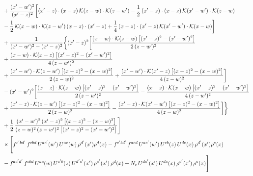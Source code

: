 \documentclass[9pt]{article}
\numberwithin{equation}{section}
\begin{document}
\begin{align}
&+\frac{(x^{\prime}-w^{\prime})^{2}}{(x^{\prime}-z)^{2}}\bigg[(x^{\prime}-z)\cdot(x-z)\,\mathcal{K}(z-w)\cdot\mathcal{K}(z-w^{\prime})-\frac{1}{2}\,(x^{\prime}-z)\cdot(x-z)\,\mathcal{K}(x^{\prime}-w^{\prime})\cdot\mathcal{K}(z-w)\notag \\ & -\frac{1}{2}\,\mathcal{K}(x-w)\cdot\mathcal{K}(z-w^{\prime})\,(x-z)\cdot(x^{\prime}-z)+\frac{1}{4}\,(x-z)\cdot(x^{\prime}-z)\,\mathcal{K}(x^{\prime}-w^{\prime})\cdot\mathcal{K}(x-w)\bigg]\notag\\
&+\frac{1}{(x^{\prime}-w^{\prime})^{2}-(x^{\prime}-z)^{2}}\bigg\{(x^{\prime}-z)^{2}\bigg[\frac{(x-w)\cdot\mathcal{K}(z-w)\,\big[(x^{\prime}-z)^{2}-(x^{\prime}-w^{\prime})^{2}\big]}{2\,(z-w^{\prime})^{2}}\notag\\ &+\frac{(x-w)\cdot\mathcal{K}(x-z)\,\big[(x^{\prime}-z)^{2}-(x^{\prime}-w^{\prime})^{2}\big]}{4\,(z-w^{\prime})^{2}}\notag \\ & +\frac{(x^{\prime}-w^{\prime})\cdot\mathcal{K}(z-w^{\prime})\,\big[(x-z)^{2}-(x-w)^{2}\big]}{2\,(z-w)^{2}}+\frac{(x^{\prime}-w^{\prime})\cdot\mathcal{K}(x^{\prime}-z)\,\big[(x-z)^{2}-(x-w)^{2}\big]}{4\,(z-w)^{2}}\bigg]\notag\\
&-(x^{\prime}-w^{\prime})^{2}\bigg[\frac{(x-z)\cdot\mathcal{K}(z-w)\,\big[(x^{\prime}-z)^{2}-(x^{\prime}-w^{\prime})^{2}\big]}{2\,(z-w^{\prime})^{2}}-\frac{(x-z)\cdot\mathcal{K}(x-w)\,\big[(x^{\prime}-z)^{2}-(x^{\prime}-w^{\prime})^{2}\big]}{4\,(z-w^{\prime})^{2}}\notag \\ & +\frac{(x^{\prime}-z)\cdot\mathcal{K}(z-w^{\prime})\,\big[(x-z)^{2}-(x-w)^{2}\big]}{2\,(z-w)^{2}}-\frac{(x^{\prime}-z)\cdot\mathcal{K}(x^{\prime}-w^{\prime})\,\big[(x-z)^{2}-(x-w)^{2}\big]}{4\,(z-w)^{2}}\bigg]\bigg\}\notag\\
&+\frac{1}{2}\,\frac{(x^{\prime}-w^{\prime})^{2}\,(x^{\prime}-z)^{2}\,\big[(x-z)^{2}-(x-w)^{2}\big]}{(z-w)^{2}\,(z-w^{\prime})^{2}\,\big[(x^{\prime}-z)^{2}-(x^{\prime}-w^{\prime})^{2}\big]}\Bigg]\notag\\
&\times\Bigg[f^{c^{\prime}bd^{\prime}}\,f^{cbd}\, U^{ac^{\prime}}(w^{\prime})\,U^{ac}(w)\,\rho^{d^{\prime}}(x^{\prime})\rho^{d}(x)- f^{c^{\prime}bd^{\prime}}\,f^{acd}\,U^{ac^{\prime}}(w^{\prime})\,U^{cb}(z)\,U^{de}(x)\,\rho^{d^{\prime}}(x^{\prime})\rho^{e}(x) \notag \\ & -f^{ac^{\prime}d^{\prime}}\,f^{cbd}\,U^{ac}(w)\,U^{c^{\prime}b}(z)\,U^{d^{\prime}e^{\prime}}(x^{\prime})\,\rho^{e^{\prime}}(x^{\prime})\,\rho^{d}(x) +N_{c}\,U^{de^{\prime}}(x^{\prime})\,U^{de}(x)\,\rho^{e^{\prime}}(x^{\prime})\,\rho^{e}(x)\Bigg]\label{eq:B-II2d}\\

\end{align}
\end{document}
